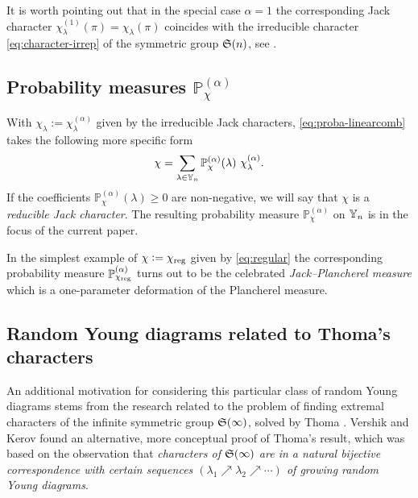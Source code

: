 \documentclass[12pt,usenames,dvipsnames,svgnames,table]{amsart}
\begin{document}
\smallskip

It is worth pointing out that in the special case $\alpha=1$ the corresponding
Jack character $\chi^{(1)}_\lambda(\pi)=\chi_\lambda(\pi)$
coincides with the irreducible character \eqref{eq:character-irrep}
of the symmetric group $\mathfrak{S}(n)$, see \cite{Lassalle2009, DolegaFeray2014}.

\subsection{Probability measures $\mathbb{P}^{(\alpha)}_\chi$}
With $\chi_\lambda:=\chi_\lambda^{(\alpha)}$ given by the irreducible Jack characters, 
\eqref{eq:proba-linearcomb} takes the following more specific form
\begin{equation}
\label{eq:proba-linearcomb-A}
\chi = \sum_{\lambda\in\Young{n}} \mathbb{P}^{(\alpha)}_\chi(\lambda) \ \chi^{(\alpha)}_\lambda.
\end{equation}
If the coefficients $\mathbb{P}^{(\alpha)}_\chi(\lambda)\geq 0$ are non-negative,
we will say that $\chi$ is a \emph{reducible Jack character}.
The resulting probability measure $\mathbb{P}^{(\alpha)}_\chi$ on $\mathbb{Y}_{n}$
is in the focus of the current paper.

\medskip

In the simplest example of $\chi:=\chi_{\operatorname{reg}}$ given by \eqref{eq:regular}
the corresponding probability measure $\mathbb{P}^{(\alpha)}_{\chi_{\operatorname{reg}}}$ turns out to be the 
celebrated \emph{Jack--Plancherel measure} \cite{Stanley1989,Fulman2004, Matsumoto2008, DolegaFeray2014,
	BorodinGorinGuionnet2015, Moll2015}
which is a one-parameter deformation of the Plancherel measure.

\subsection{Random Young diagrams related to Thoma's characters}
An additional motivation for considering this particular
class of random Young diagrams
stems from the research related to the problem of finding extremal characters 
of the infinite symmetric group $\mathfrak{S}(\infty)$, solved by Thoma \cite{Thoma1964}. 
Vershik and Kerov \cite{VershikKerov1981a}
found an alternative, more conceptual proof of Thoma's result, 
which was based on the observation that 
\emph{characters of $\mathfrak{S}(\infty)$
	are in a natural bijective correspondence with 
	certain sequences $(\lambda_1\nearrow \lambda_2\nearrow\cdots)$ 
	of growing random Young diagrams}.
\end{document}
